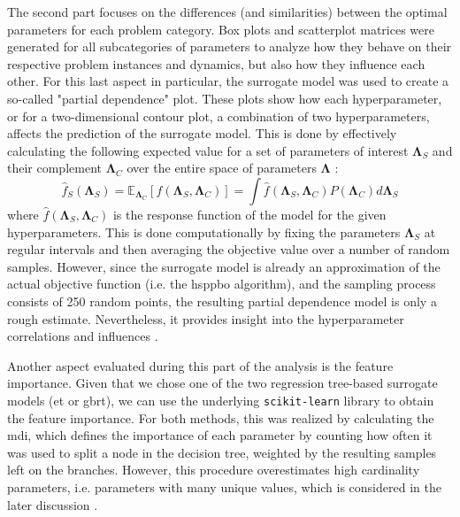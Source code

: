 The second part focuses on the differences (and similarities) between the optimal parameters for each problem category. Box plots and scatterplot matrices were generated for all subcategories of parameters to analyze how they behave on their respective problem instances and dynamics, but also how they influence each other. For this last aspect in particular, the surrogate model was used to create a so-called "partial dependence" plot. These plots show how each hyperparameter, or for a two-dimensional contour plot, a combination of two hyperparameters, affects the prediction of the surrogate model. This is done by effectively calculating the following expected value for a set of parameters of interest $\mathbf{\Lambda}_S$ and their complement $\mathbf{\Lambda}_C$ over the entire space of parameters $\mathbf{\Lambda}$ \cite[Chapter~10.13.2]{hastie2009elements}:
\begin{equation}
	\hat{f}_S (\mathbf{\Lambda}_S) = \mathbb{E}_{\mathbf{\Lambda}_C} \left[ f(\mathbf{\Lambda}_S,\mathbf{\Lambda}_C)\right] = \int \hat{f}(\mathbf{\Lambda}_S,\mathbf{\Lambda}_C) P(\mathbf{\Lambda}_C) d\mathbf{\Lambda}_S
\end{equation}
where $\hat{f}(\mathbf{\Lambda}_S,\mathbf{\Lambda}_C)$ is the response function of the model for the given hyperparameters. This is done computationally by fixing the parameters $\mathbf{\Lambda}_S$ at regular intervals and then averaging the objective value over a number of random samples. However, since the surrogate model is already an approximation of the actual objective function (i.e. the \gls{hsppbo} algorithm), and the sampling process consists of 250 random points, the resulting partial dependence model is only a rough estimate. Nevertheless, it provides insight into the hyperparameter correlations and influences \cite{friedman2001greedy}.

Another aspect evaluated during this part of the analysis is the feature importance. Given that we chose one of the two regression tree-based surrogate models (\gls{et} or \gls{gbrt}), we can use the underlying \texttt{scikit-learn} library to obtain the feature importance. For both methods, this was realized by calculating the \gls{mdi}, which defines the importance of each parameter by counting how often it was used to split a node in the decision tree, weighted by the resulting samples left on the branches. However, this procedure overestimates high cardinality parameters, i.e. parameters with many unique values, which is considered in the later discussion \cite{strobl2007bias}.

